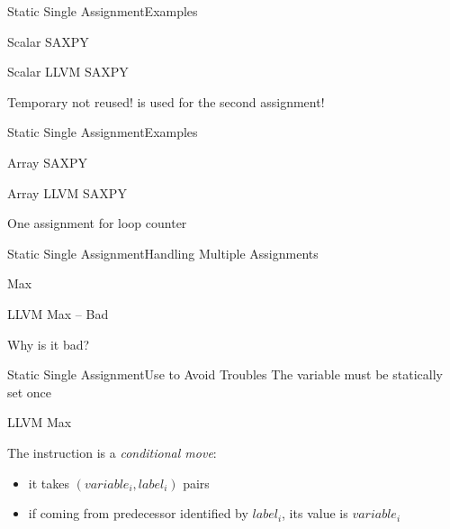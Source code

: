 \documentclass[10pt,mathserif]{beamer}
\begin{document}
\begin{frame}{Static Single Assignment}{Examples}
\begin{block}{Scalar SAXPY}
\centering
{}
\end{block}

\begin{block}{Scalar LLVM SAXPY}
\centering
{}
\end{block}

Temporary  not reused!  is used for the second
assignment!
\end{frame}

\begin{frame}{Static Single Assignment}{Examples}
\begin{block}{Array SAXPY}
\centering
{}
\end{block}

\begin{block}{Array LLVM SAXPY}
\centering
{}
\end{block}

One assignment for loop counter 
\end{frame}

\begin{frame}{Static Single Assignment}{Handling Multiple Assignments}
\begin{block}{Max}
\centering
{}
\end{block}

\begin{block}{LLVM Max -- Bad}
\centering
{}
\end{block}

Why is it bad?
\end{frame}

\begin{frame}{Static Single Assignment}{Use  to Avoid Troubles}
The  variable must be statically set once

\begin{block}{LLVM Max}
\centering
{}
\end{block}

The  instruction is a \emph{conditional move}:

\begin{itemize}
\item it takes $(variable_i, label_i)$ pairs
\item if coming from predecessor identified by $label_i$, its value is $variable_i$
\end{itemize}
\end{frame}
\end{document}
